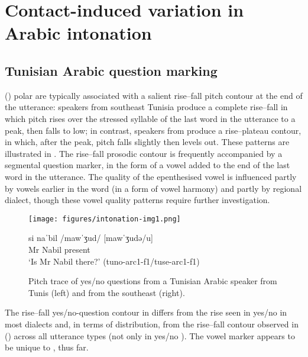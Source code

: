 \documentclass[output=paper]{langsci/langscibook}
\begin{document}
 \section{Contact-induced variation in Arabic intonation} \label{araint}


 \subsection{Tunisian Arabic question marking} \label{tunis}


 () polar  are typically associated with a salient rise--fall pitch contour at the end of the utterance: speakers from southeast Tunisia produce a complete rise--fall in which pitch rises over the stressed syllable of the last word in the utterance to a peak, then falls to low; in contrast, speakers from  produce a rise--plateau contour, in which, after the peak, pitch falls slightly then levels out. These patterns are illustrated in  \citep{BouchhiouaHellmuthAlmbark2019}. The rise--fall prosodic contour is frequently accompanied by a segmental question marker, in the form of a vowel added to the end of the last word in the utterance. The quality of the epenthesised vowel is influenced partly by vowels earlier in the word (in a form of vowel harmony) and partly by regional dialect, though these vowel quality patterns require further investigation.

  
\begin{figure}
\caption{\label{fig:hellmuth:1}Pitch trace of yes/no questions from a Tunisian Arabic speaker from Tunis (left) and from the southeast (right).}
\texttt{[image: figures/intonation-img1.png]}
\hspace*{.25cm}\parbox{10cm}{\gll si  naˈbil  /mawˈʒud/ [mawˈʒudə/u]\\
     Mr  Nabil  present\\
\glt ‘Is Mr Nabil there?’  (tuno-arc1-f1/tuse-arc1-f1)}
\end{figure}

The rise--fall yes/no-question contour in  differs from the rise seen in yes/no  in most  dialects \citep{Hellmuthtoappearbook} and, in terms of distribution, from the rise--fall contour observed in  () across all utterance types (not only in yes/no ). The vowel  marker appears to be unique to , thus far.
\end{document}
